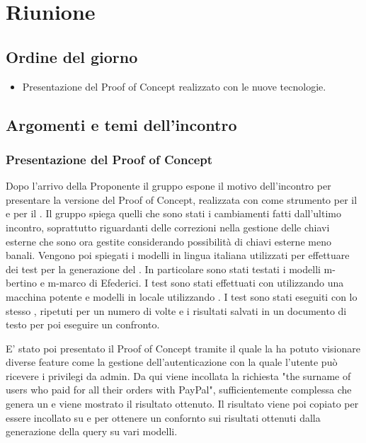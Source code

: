 \section{Riunione}
\subsection{Ordine del giorno}
\begin{itemize}
	\item Presentazione del Proof of Concept realizzato con le nuove tecnologie.
\end{itemize}

\subsection{Argomenti e temi dell'incontro}

\subsubsection{Presentazione del Proof of Concept}

\par Dopo l'arrivo della Proponente il gruppo espone il motivo dell'incontro per presentare la versione del Proof of Concept, realizzata con  come strumento per il  e  per il .
Il gruppo spiega quelli che sono stati i cambiamenti fatti dall'ultimo incontro, soprattutto riguardanti delle correzioni nella gestione delle chiavi esterne che sono ora gestite considerando possibilità di chiavi esterne meno banali.
Vengono poi spiegati i modelli in lingua italiana utilizzati per effettuare dei test per la generazione del . In particolare sono stati testati i modelli m-bertino e m-marco di Efederici. I test sono stati effettuati con  utilizzando una macchina potente e modelli in locale utilizzando . 
I test sono stati eseguiti con lo stesso , ripetuti per un numero di volte e i risultati salvati in un documento di testo per poi eseguire un confronto.

\par E' stato poi presentato il Proof of Concept tramite il quale la  ha potuto visionare diverse feature come la gestione dell'autenticazione con la quale l'utente può ricevere i privilegi da admin. 
Da qui viene incollata la richiesta "the surname of users who paid for all their orders with PayPal", sufficientemente complessa che genera un  e viene mostrato il risultato ottenuto.
Il risultato viene poi copiato per essere incollato su  e  per ottenere un confornto sui risultati ottenuti dalla generazione della query su vari modelli.


